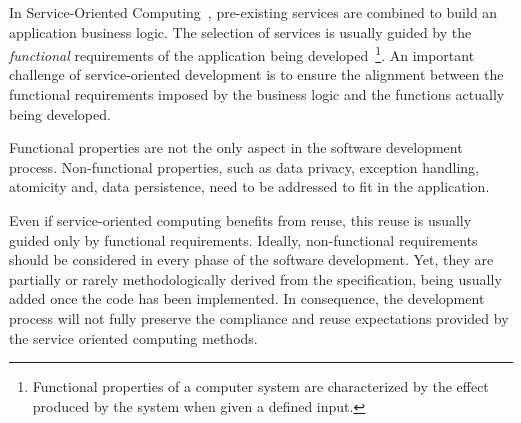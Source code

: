 




In Service-Oriented Computing~\cite{Papazoglou2007}, pre-existing services are
combined to build an application business logic.
The selection of services is usually guided by the \textit{functional} requirements of the application being developed~\cite{1,2,decastro1,PapazoglouH06}\footnote{Functional properties of a computer system are characterized by the effect produced by the system when given a defined input.}.
An important challenge of service-oriented development is  to ensure the alignment between the functional requirements imposed by the business logic and the functions actually being developed.

Functional properties are not the only  aspect in the software development process.
Non-functional properties, such as data privacy, exception handling, atomicity  and, data persistence, need to be addressed  to fit in the application.

Even if service-oriented computing benefits from reuse, this reuse is usually guided only by functional requirements.
%
Ideally, non-functional requirements should be considered in every phase of the software development.
Yet,  they are partially or rarely methodologically derived from the specification, being usually added once the code has been implemented. 
In consequence, the development process will not fully preserve the compliance and reuse expectations provided by the service oriented computing methods.


